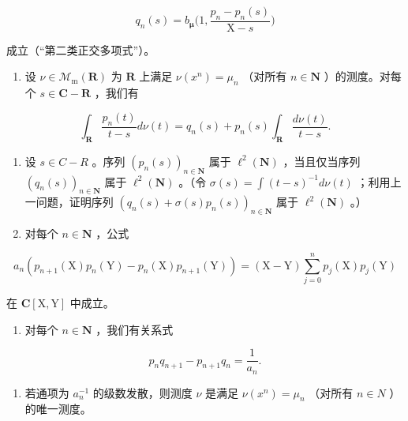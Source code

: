 \[
q _ {n} (s) = b _ {\pmb {\mu}} \Big (1, \frac {p _ {n} - p _ {n} (s)}{\mathrm{X} - s} \Big)
\]

成立（“第二类正交多项式”）。

\begin{enumerate}
\def\labelenumi{\alph{enumi})}
\setcounter{enumi}{1}
\tightlist
\item
  设 \(\nu \in \mathcal{M}_{\mathrm{m}}(\mathbf{R})\) 为 \(\mathbf{R}\) 上满足 \(\nu(x^n) = \mu_n\) （对所有 \(n \in \mathbf{N}\) ）的测度。对每个 \(s \in \mathbf{C} - \mathbf{R}\) ，我们有
\end{enumerate}

\[
\int_ {\mathbf {R}} \frac {p _ {n} (t)}{t - s} d \nu (t) = q _ {n} (s) + p _ {n} (s) \int_ {\mathbf {R}} \frac {d \nu (t)}{t - s}.
\]

\begin{enumerate}
\def\labelenumi{\alph{enumi})}
\setcounter{enumi}{2}
\item
  设 \(s \in C-R\) 。序列 \((p_{n}(s))_{n \in \mathbf{N}}\) 属于 \(\ell^{2}(\mathbf{N})\) ，当且仅当序列 \((q_{n}(s))_{n \in \mathbf{N}}\) 属于 \(\ell^{2}(\mathbf{N})\) 。（令 \(\sigma(s) = \int(t-s)^{-1} d\nu(t)\) ；利用上一问题，证明序列 \((q_{n}(s) + \sigma(s)p_{n}(s))_{n \in \mathbf{N}}\) 属于 \(\ell^{2}(\mathbf{N})\) 。）
\item
  对每个 \(n \in \mathbf{N}\) ，公式
\end{enumerate}

\[
a _ {n} (p _ {n + 1} (\mathrm{X}) p _ {n} (\mathrm{Y}) - p _ {n} (\mathrm{X}) p _ {n + 1} (\mathrm{Y})) = (\mathrm{X} - \mathrm{Y}) \sum_ {j = 0} ^ {n} p _ {j} (\mathrm{X}) p _ {j} (\mathrm{Y})
\]

在 \(\mathbf{C}[\mathrm{X},\mathrm{Y}]\) 中成立。

\begin{enumerate}
\def\labelenumi{\alph{enumi})}
\setcounter{enumi}{4}
\tightlist
\item
  对每个 \(n \in \mathbf{N}\) ，我们有关系式
\end{enumerate}

\[
p _ {n} q _ {n + 1} - p _ {n + 1} q _ {n} = \frac {1}{a _ {n}}.
\]

\begin{enumerate}
\def\labelenumi{\alph{enumi})}
\setcounter{enumi}{5}
\tightlist
\item
  若通项为 \(a_{n}^{-1}\) 的级数发散，则测度 \(\nu\) 是满足 \(\nu(x^{n}) = \mu_{n}\) （对所有 \(n \in N\) ）的唯一测度。
\end{enumerate}

